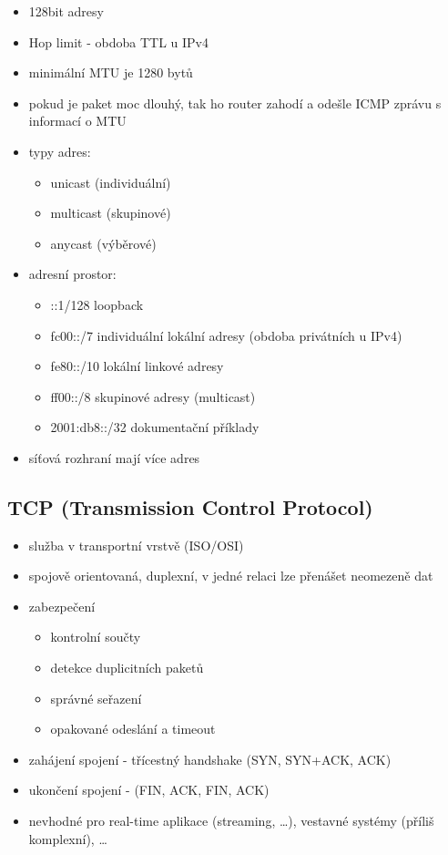 \documentclass{szzclass}
\providecommand{\tightlist}{%
  \setlength{\itemsep}{0pt}\setlength{\parskip}{0pt}}
\begin{document}
\begin{itemize}
\tightlist
\item
  128bit adresy
\item
  Hop limit - obdoba TTL u IPv4
\item
  minimální MTU je 1280 bytů
\item
  pokud je paket moc dlouhý, tak ho router zahodí a odešle ICMP zprávu s
  informací o MTU
\item
  typy adres:

  \begin{itemize}
  \tightlist
  \item
    unicast (individuální)
  \item
    multicast (skupinové)
  \item
    anycast (výběrové)
  \end{itemize}
\item
  adresní prostor:

  \begin{itemize}
  \tightlist
  \item
    ::1/128 loopback
  \item
    fc00::/7 individuální lokální adresy (obdoba privátních u IPv4)
  \item
    fe80::/10 lokální linkové adresy
  \item
    ff00::/8 skupinové adresy (multicast)
  \item
    2001:db8::/32 dokumentační příklady
  \end{itemize}
\item
  síťová rozhraní mají více adres
\end{itemize}

\hypertarget{tcp-transmission-control-protocol}{%
\subsection{TCP (Transmission Control
Protocol)}\label{tcp-transmission-control-protocol}}

\begin{itemize}
\tightlist
\item
  služba v transportní vrstvě (ISO/OSI)
\item
  spojově orientovaná, duplexní, v jedné relaci lze přenášet neomezeně
  dat
\item
  zabezpečení

  \begin{itemize}
  \tightlist
  \item
    kontrolní součty
  \item
    detekce duplicitních paketů
  \item
    správné seřazení
  \item
    opakované odeslání a timeout
  \end{itemize}
\item
  zahájení spojení - třícestný handshake (SYN, SYN+ACK, ACK)
\item
  ukončení spojení - (FIN, ACK, FIN, ACK)
\item
  nevhodné pro real-time aplikace (streaming, \ldots), vestavné systémy
  (příliš komplexní), \ldots{}
\end{itemize}
\end{document}
